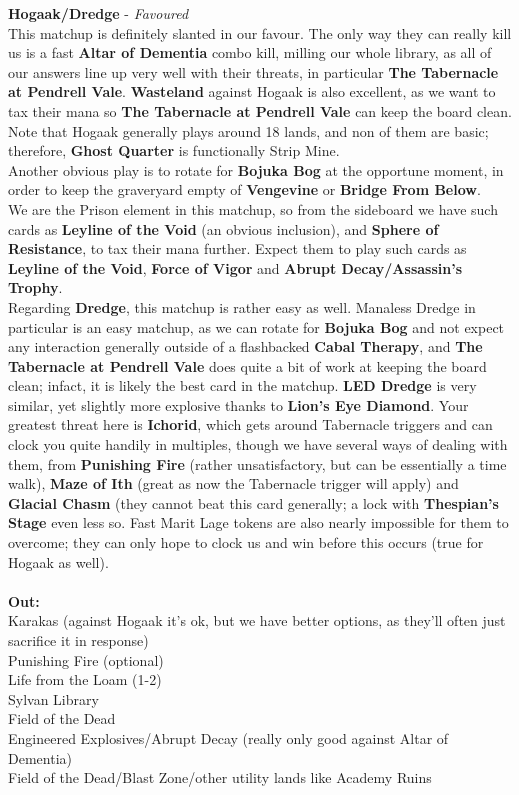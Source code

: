 \documentclass{report}
\begin{document}
\textbf{Hogaak/Dredge} - \emph{Favoured}\\
This matchup is definitely slanted in our favour. The only way they can really kill us is a fast \textbf{Altar of Dementia} combo kill, milling our whole library, as all of our answers line up very well with their threats, in particular \textbf{The Tabernacle at Pendrell Vale}. \textbf{Wasteland} against Hogaak is also excellent, as we want to tax their mana so \textbf{The Tabernacle at Pendrell Vale} can keep the board clean. Note that Hogaak generally plays around 18 lands, and non of them are basic; therefore, \textbf{Ghost Quarter} is functionally Strip Mine.\\ Another obvious play is to rotate for \textbf{Bojuka Bog} at the opportune moment, in order to keep the graveryard empty of \textbf{Vengevine} or \textbf{Bridge From Below}.\\ We are the Prison element in this matchup, so from the sideboard we have such cards as \textbf{Leyline of the Void} (an obvious inclusion), and \textbf{Sphere of Resistance}, to tax their mana further. Expect them to play such cards as \textbf{Leyline of the Void}, \textbf{Force of Vigor} and \textbf{Abrupt Decay/Assassin's Trophy}.\\
Regarding \textbf{Dredge}, this matchup is rather easy as well. Manaless Dredge in particular is an easy matchup, as we can rotate for \textbf{Bojuka Bog} and not expect any interaction generally outside of a flashbacked \textbf{Cabal Therapy}, and \textbf{The Tabernacle at Pendrell Vale} does quite a bit of work at keeping the board clean; infact, it is likely the best card in the matchup. \textbf{LED Dredge} is very similar, yet slightly more explosive thanks to \textbf{Lion's Eye Diamond}. Your greatest threat here is \textbf{Ichorid}, which gets around Tabernacle triggers and can clock you quite handily in multiples, though we have several ways of dealing with them, from \textbf{Punishing Fire} (rather unsatisfactory, but can be essentially a time walk), \textbf{Maze of Ith} (great as now the Tabernacle trigger will apply) and \textbf{Glacial Chasm} (they cannot beat this card generally; a lock with \textbf{Thespian's Stage} even less so. Fast Marit Lage tokens are also nearly impossible for them to overcome; they can only hope to clock us and win before this occurs (true for Hogaak as well).\\\\
\textbf{Out:}\\
Karakas (against Hogaak it's ok, but we have better options, as they'll often just sacrifice it in response)\\Punishing Fire (optional)\\Life from the Loam (1-2)\\Sylvan Library\\Field of the Dead\\Engineered Explosives/Abrupt Decay (really only good against Altar of Dementia)\\Field of the Dead/Blast Zone/other utility lands like Academy Ruins\\\\
\end{document}
